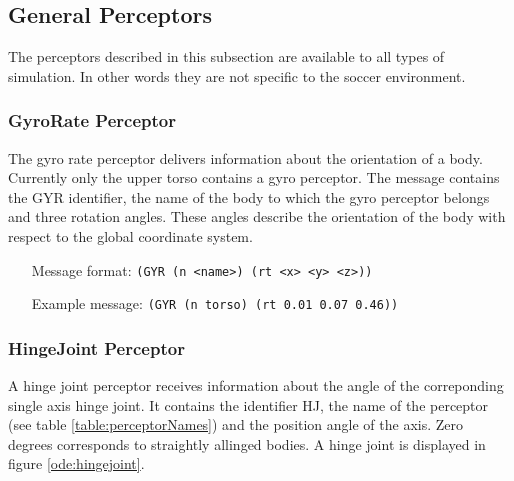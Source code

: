 \subsection{General Perceptors}
The perceptors described in this subsection are available to all types of
simulation. In other words they are not specific to the soccer environment.

\subsubsection{GyroRate Perceptor}
The gyro rate perceptor delivers information about the orientation of a body.
Currently only the upper torso contains a gyro perceptor.
The message contains the GYR identifier, the name of the body to which the gyro
perceptor belongs and three rotation angles. These angles describe the
orientation of the body with respect to the global coordinate system.
\begin{itemize}
	\item[Message format:] \texttt{(GYR (n <name>) (rt <x> <y> <z>))}
	\item[Example message:] \texttt{(GYR (n torso) (rt 0.01 0.07 0.46))}
\end{itemize}


\subsubsection{HingeJoint Perceptor}
A hinge joint perceptor receives information about the angle of the
correponding single axis hinge joint. It contains the identifier HJ, the name
of the perceptor (see table \ref{table:perceptorNames}) and the position angle of the axis. Zero
degrees corresponds to straightly allinged bodies. A hinge joint is displayed
in figure \ref{ode:hingejoint}. 

